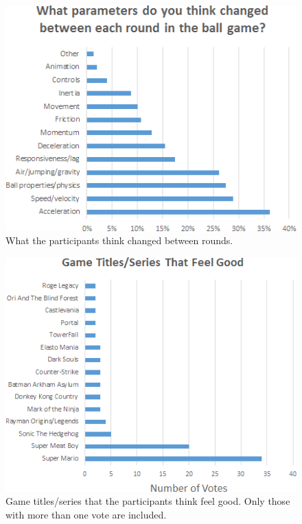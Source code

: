 \begin{figure}[htbp]
\centering
\includegraphics[width=0.9\columnwidth]{Pics/whatChanged}
\caption{What the participants think changed between rounds.}
\label{fig:whatChanged}
\end{figure}

\begin{figure}[htbp]
\centering
\includegraphics[width=0.9\columnwidth]{Pics/good_games}
\caption{Game titles/series that the participants think feel good. Only those with more than one vote are included.}
\label{fig:good_games}
\end{figure}

